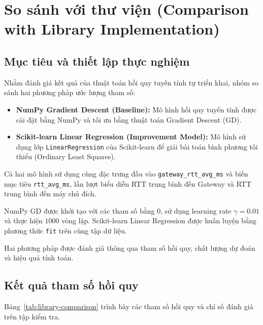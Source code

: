 
\section{So sánh với thư viện
(Comparison with Library Implementation)}
\label{sec:library-comparison}

\subsection{Mục tiêu và thiết lập thực nghiệm}

Nhằm đánh giá kết quả của thuật toán hồi quy
tuyến tính tự triển khai, nhóm so sánh hai
phương pháp ước lượng tham số:

\begin{itemize}
    \item \textbf{NumPy Gradient Descent (Baseline):}
    Mô hình hồi quy tuyến tính được cài đặt
    bằng NumPy và tối ưu bằng thuật toán
    Gradient Descent (GD).

    \item \textbf{Scikit-learn Linear Regression
    (Improvement Model):}
    Mô hình sử dụng lớp
    \texttt{LinearRegression} của Scikit-learn
    để giải bài toán bình phương tối thiểu
    (Ordinary Least Squares).
\end{itemize}

Cả hai mô hình sử dụng cùng đặc trưng đầu vào
\texttt{gateway\_rtt\_avg\_ms} và biến mục tiêu
\texttt{rtt\_avg\_ms}, lần lượt biểu diễn
RTT trung bình đến Gateway và RTT trung bình
đến máy chủ đích.

NumPy GD được khởi tạo với các tham số
bằng $0$, sử dụng learning rate
$\gamma=0.01$ và thực hiện $1000$ vòng lặp.
Scikit-learn Linear Regression được
huấn luyện bằng phương thức \texttt{fit}
trên cùng tập dữ liệu.

Hai phương pháp được đánh giá thông qua
tham số hồi quy, chất lượng dự đoán
và hiệu quả tính toán.


\subsection{Kết quả tham số hồi quy}

Bảng~\ref{tab:library-comparison}
trình bày các tham số hồi quy và
chỉ số đánh giá trên tập kiểm tra.

